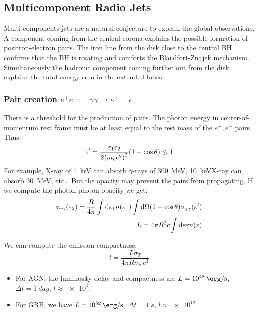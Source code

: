 \documentclass[10pt,a4paper,english]{article}
\let\originalleft\left
\let\originalright\right
\renewcommand{\left}{\mathopen{}\mathclose\bgroup\originalleft}
\renewcommand{\right}{\aftergroup\egroup\originalright}
\begin{document}
\subsection{Multicomponent Radio Jets}
Multi components jets are a natural conjecture to explain the global
observations. A component coming from the central corona explains the
possible formation of positron-electron pairs. The iron  line
from the disk close to the central BH confirms that the BH is rotating
and comforts the Blandfort-Znajek mechanism. Simultaneously the
hadronic component coming further out from the disk explains the total
energy seen in the extended lobes.
\subsubsection{\texorpdfstring{Pair creation
    $e^+ e^-: \quad \gamma\gamma \rightarrow e^+ + e^-$}{Pair creation
    e⁺e⁻: γγ → e⁺ + e⁻}}
There is a threshold for the production of pairs. The photon energy in
center-of-momentum rest frame must be at least equal to the rest mass
of the $e^+,e^-$ pairs. Thus:
\begin{equation}
  \varepsilon' = \frac{\varepsilon_1\varepsilon_2}{2 \left( m_ec^2 \right)^2}\left( 1-\cos\theta \right) \leq 1
\end{equation}
For example, X-ray of \SI{1}{keV} can absorb $\gamma$-rays of
\SI{300}{MeV}, \SI{10}{keV}X-ray can absorb \SI{30}{MeV}, etc… But the
opacity may prevent the pairs from propagating. If we compute the
photon-photon opacity we get:
\begin{align}
  \tau_{\gamma\gamma} (\varepsilon_2) = \frac{R}{4\pi}\int\mathrm{d}\varepsilon_1 n(\varepsilon_1) \int\mathrm{d}\Omega (1 - \cos\theta) \sigma_{\gamma\gamma} (\varepsilon') \\
  L = 4\pi R^2 c\int\mathrm{d}\varepsilon \varepsilon n(\varepsilon)
\end{align}

We can compute the emission compactness:
\begin{equation}
  l = \frac{L\sigma_T}{4\pi Rm_ec^3}
\end{equation}
\begin{itemize}
\item For AGN, the luminosity delay and compactness are
  $L = \SI{e48}{\erg\per\s}$, $\Delta t = \SI{1}{day}$,
  $l\approx \num{e3}$.
\item For GRB, we have $L=\SI{e52}{\erg\per\s}$,
  $\Delta t = \SI{1}{s}$, $l \approx \num{e12}$
\end{itemize}
\end{document}
